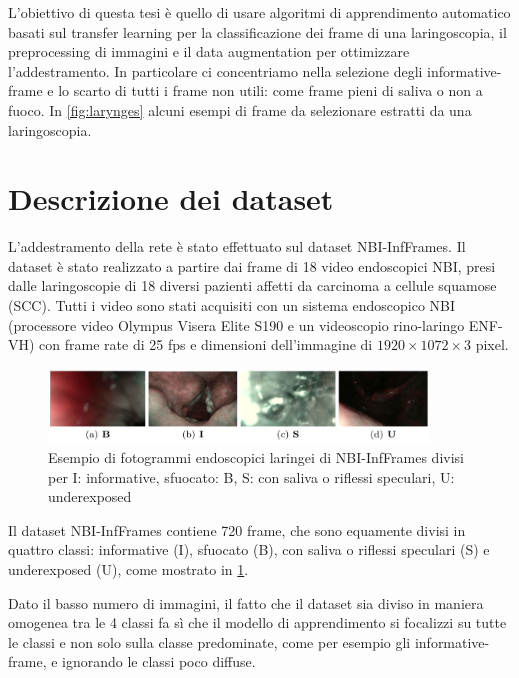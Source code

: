 L'obiettivo di questa tesi è quello di usare algoritmi di apprendimento automatico basati sul transfer learning per la classificazione dei frame di una laringoscopia, il  preprocessing di immagini e il data augmentation per ottimizzare l'addestramento. In particolare ci concentriamo nella selezione degli informative-frame e lo scarto di tutti i frame non utili: come frame pieni di saliva o non a fuoco. In \cref{fig:larynges} alcuni esempi di frame da selezionare estratti da una laringoscopia.

\section{Descrizione dei dataset}\label{descrizione-dei-dataset}

L'addestramento della rete è stato effettuato  sul dataset
NBI-InfFrames. Il dataset
è stato realizzato a partire dai frame di 18 video endoscopici NBI, presi dalle laringoscopie di
18 diversi pazienti affetti da carcinoma a cellule squamose
(SCC). Tutti i video sono stati acquisiti con un sistema endoscopico
NBI (processore video Olympus Visera Elite S190 e
un videoscopio rino-laringo ENF-VH) con frame rate di
25 fps e dimensioni dell'immagine di \(1920\times 1072\times 3\) pixel.

\begin{figure}[ht]
    \centering
    \includegraphics[width=0.9\textwidth]{introduzione/Larynge.jpg}
    \caption[Esempio di fotogrammi endoscopici laringei di NBI-InfFrames]{Esempio di fotogrammi endoscopici laringei di NBI-InfFrames divisi per I: informative, sfuocato: B, S: con
    saliva o riflessi speculari,
    U: underexposed}
    \label{fig:larynges-2}
\end{figure}

Il dataset NBI-InfFrames contiene 720 frame, che sono equamente divisi in quattro classi: informative (I), sfuocato (B), con saliva o riflessi speculari (S) e underexposed  (U), come mostrato in \cref{fig:larynges-2}. 

Dato il basso numero di immagini, il fatto che il dataset sia diviso in maniera omogenea tra le 4 classi fa sì che il modello di apprendimento si focalizzi su tutte le classi e non solo sulla classe predominate, come per esempio gli informative-frame, e ignorando le classi poco diffuse.

